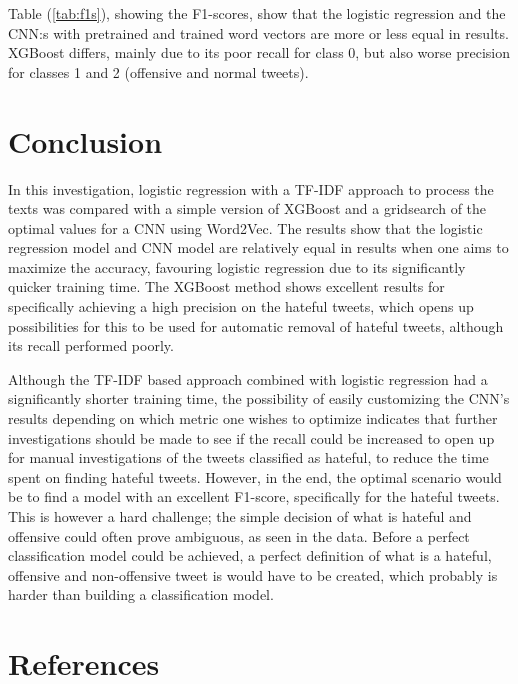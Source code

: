 \documentclass[twocolumn]{article}
\begin{document}
Table (\ref{tab:f1s}), showing the F1-scores, show that the logistic regression and the CNN:s with pretrained and trained word vectors are more or less equal in results. XGBoost differs, mainly due to its poor recall for class 0, but also worse precision for classes 1 and 2 (offensive and normal tweets). 

\section{Conclusion}

In this investigation, logistic regression with a TF-IDF approach to process the texts was compared with a simple version of XGBoost and a gridsearch of the optimal values for a CNN using Word2Vec. The results show that the logistic regression model and CNN model are relatively equal in results when one aims to maximize the accuracy, favouring logistic regression due to its significantly quicker training time. The XGBoost method shows excellent results for specifically achieving a high precision on the hateful tweets, which opens up possibilities for this to be used for automatic removal of hateful tweets, although its recall performed poorly. 

Although the TF-IDF based approach combined with logistic regression had a significantly shorter training time, the possibility of easily customizing the CNN's results depending on which metric one wishes to optimize indicates that further investigations should be made to see if the recall could be increased to open up for manual investigations of the tweets classified as hateful, to reduce the time spent on finding hateful tweets. However, in the end, the optimal scenario would be to find a model with an excellent F1-score, specifically for the hateful tweets. This is however a hard challenge; the simple decision of what is hateful and offensive could often prove ambiguous, as seen in the data. Before a perfect classification model could be achieved, a perfect definition of what is a hateful, offensive and non-offensive tweet is would have to be created, which probably is harder than building a classification model. 

\section{References}


\end{document}
